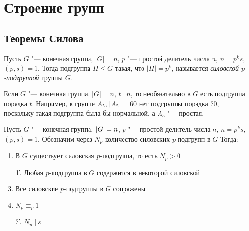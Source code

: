 \section{Строение групп}

\subsection{Теоремы Силова}

\begin{definition}
	Пусть $G$ "--- конечная группа, $|G| = n$, $p$ "--- простой делитель числа $n$, $n = p^ks$, $(p, s) = 1$. Тогда подгруппа $H \le G$ такая, что $|H| = p^k$, называется \textit{силовской $p$-подгруппой} группы $G$.
\end{definition}

\begin{note}
	Если $G$ "--- конечная группа, $|G| = n$, $t \mid n$, то необязательно в $G$ есть подгруппа порядка $t$. Например, в группе $A_5$, $|A_5| = 60$ нет подгруппы порядка 30, поскольку такая подгруппа была бы нормальной, а $A_5$ "--- простая.
\end{note}

\begin{theorem}
	Пусть $G$ "--- конечная группа, $|G| \hm= n$, $p$ "--- простой делитель числа $n$, $n = p^ks$, $(p, s) = 1$. Обозначим через $N_p$ количество силовских $p$-подгрупп в $G$ Тогда:
	\begin{enumerate}[align=left, leftmargin=15pt]
		\item В $G$ существует силовская $p$-подгруппа, то есть $N_p > 0$
		\item[1'.] Любая $p$-подгруппа в $G$ содержится в некоторой силовской
		\item Все силовские $p$-подгруппы в $G$ сопряжены
		\item $N_p \equiv_p 1$
		\item[3'.] $N_p \mid s$
	\end{enumerate}
\end{theorem}

